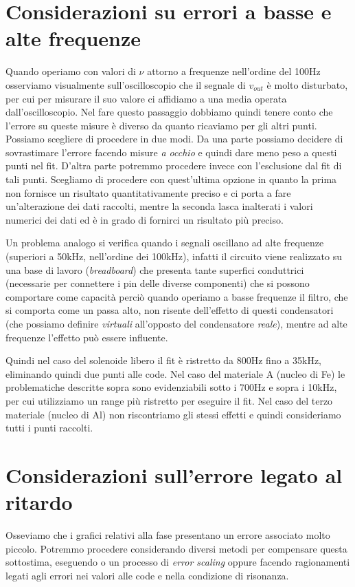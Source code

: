\documentclass[
    rmp,
    floatfix,
    reprint, 
    superscriptaddress, 
    altaffilletter, 
    amsmath, 
    amssymb, 
    a4paper]{revtex4-2}
\begin{document}
\section*{Considerazioni su errori a basse e alte frequenze}
Quando operiamo con valori di $\nu$ attorno a frequenze nell'ordine del 100Hz osserviamo visualmente sull'oscilloscopio che il segnale di $v_{out}$ è molto disturbato, per cui per misurare il suo valore ci affidiamo a una media operata dall'oscilloscopio. Nel fare questo passaggio dobbiamo quindi tenere conto che l'errore su queste misure è diverso da quanto ricaviamo per gli altri punti. Possiamo scegliere di procedere in due modi. Da una parte possiamo decidere di sovrastimare l'errore facendo misure \textit{a occhio} e quindi dare meno peso a questi punti nel fit. D'altra parte potremmo procedere invece con l'esclusione dal fit di tali punti. Scegliamo di procedere con quest'ultima opzione in quanto la prima non fornisce un risultato quantitativamente preciso e ci porta a fare un'alterazione dei dati raccolti, mentre la seconda lasca inalterati i valori numerici dei dati ed è in grado di fornirci un risultato più preciso. 

Un problema analogo si verifica quando i segnali oscillano ad alte frequenze (superiori a 50kHz, nell'ordine dei 100kHz), infatti il circuito viene realizzato su una base di lavoro (\textit{breadboard}) che presenta tante superfici conduttrici (necessarie per connettere i pin delle diverse componenti) che si possono comportare come capacità perciò quando operiamo a basse frequenze il filtro, che si comporta come un passa alto, non risente dell'effetto di questi condensatori (che possiamo definire \textit{virtuali} all'opposto del condensatore \textit{reale}), mentre ad alte frequenze l'effetto può essere influente. 

Quindi nel caso del solenoide libero il fit è ristretto da 800Hz fino a 35kHz, eliminando quindi due punti alle code. Nel caso del materiale A (nucleo di Fe) le problematiche descritte sopra sono evidenziabili sotto i 700Hz e sopra i 10kHz, per cui utilizziamo un range più ristretto per eseguire il fit. Nel caso del terzo materiale (nucleo di Al) non riscontriamo gli stessi effetti e quindi consideriamo tutti i punti raccolti. 

\section*{Considerazioni sull'errore legato al ritardo}
Osseviamo che i grafici relativi alla fase presentano un errore associato molto piccolo. Potremmo procedere considerando diversi metodi per compensare questa sottostima, eseguendo o un processo di \textit{error scaling} oppure facendo ragionamenti legati agli errori nei valori alle code e nella condizione di risonanza. 
\end{document}
